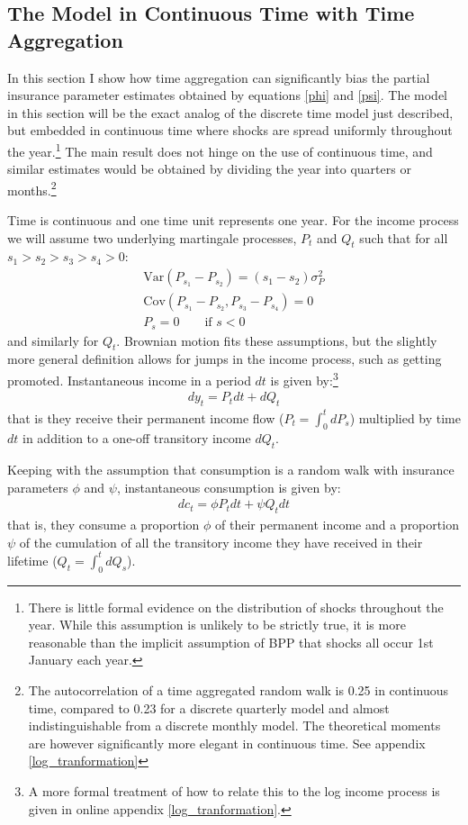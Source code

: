 \documentclass[AER]{AEA}
\begin{document}
\subsection{The Model in Continuous Time with Time Aggregation}
In this section I show how time aggregation can significantly bias the partial insurance parameter estimates obtained by equations \ref{phi} and \ref{psi}. The model in this section will be the exact analog of the discrete time model just described, but embedded in continuous time where shocks are spread uniformly throughout the year.\footnote{There is little formal evidence on the distribution of shocks throughout the year. While this assumption is unlikely to be strictly true, it is more reasonable than the implicit assumption of BPP that shocks all occur 1st January each year.} The main result does not hinge on the use of continuous time, and similar estimates would be obtained by dividing the year into quarters or months.\footnote{The autocorrelation of a time aggregated random walk is 0.25 in continuous time, compared to 0.23 for a discrete quarterly model and almost indistinguishable from a discrete monthly model. The theoretical moments are however significantly more elegant in continuous time. See appendix \ref{log_tranformation}}

Time is continuous and one time unit represents one year. For the income process we will assume two underlying martingale processes, $P_t$ and $Q_t$ such that for all $s_1>s_2>s_3>s_4>0$:
\begin{align*}
\mathrm{Var}(P_{s_1}-P_{s_2})=(s_1-s_2)\sigma_P^2 \\
\mathrm{Cov}(P_{s_1}-P_{s_2},P_{s_3}-P_{s_4}) = 0 \\
P_s = 0 \qquad \text{if } s<0
\end{align*}
and similarly for $Q_t$. Brownian motion fits these assumptions, but the slightly more general definition allows for jumps in the income process, such as getting promoted.  Instantaneous income in a period $dt$ is given by:\footnote{A more formal treatment of how to relate this to the log income process is given in online appendix \ref{log_tranformation}.}
\begin{align}
dy_t = P_t dt  +dQ_t \label{income_process}
\end{align}
that is they receive their permanent income flow ($P_t =\int_{0}^{t}dP_s $) multiplied by time $dt$ in addition to a one-off transitory income $dQ_t$.

Keeping with the assumption that consumption is a random walk with insurance parameters $\phi$ and $\psi$, instantaneous consumption is given by:
\begin{align}
dc_t = \phi P_t  dt +\psi Q_t  dt  \label{consumption_process}
\end{align}
that is, they consume a proportion $\phi$ of their permanent income and a proportion $\psi$ of the cumulation of all the transitory income they have received in their lifetime  ($Q_t =\int_{0}^{t}dQ_s $).
\end{document}

